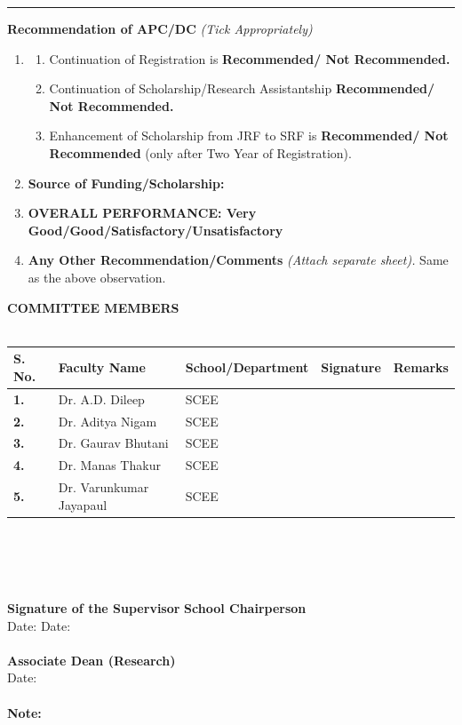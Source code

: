 \documentclass[12 pt, a4paper]{article}
\newcommand{\HRule}{\rule{\linewidth}{1mm}}
\begin{document}
\vskip 0.7cm
{\raggedleft{}\HRule}
\textbf{Recommendation of APC/DC} \textit{(Tick Appropriately)}
\begin{enumerate}
	\item
	\begin{enumerate}
\item Continuation of Registration is \textbf{Recommended/ Not Recommended.}
\item Continuation of Scholarship/Research Assistantship \textbf{ Recommended/ Not Recommended.}
\item Enhancement of Scholarship from JRF to SRF is \textbf{Recommended/ Not Recommended } (only
after Two Year of Registration).
\end{enumerate}
\item
\textbf{Source of Funding/Scholarship:}

\item \textbf{OVERALL PERFORMANCE: Very Good/Good/Satisfactory/Unsatisfactory}
\item \textbf{Any Other Recommendation/Comments} \textit{(Attach separate sheet).}
Same as the above observation.
\end{enumerate}
\vspace*{1cm}

\noindent \textbf{COMMITTEE MEMBERS}\\\\
\indent
\begin{tabular}{|p{1.25cm}|p{5cm}|p{4cm}|p{3cm}|p{2cm}|}
	\hline\rule{0pt}{15pt} \bf S. No. & \bf Faculty Name & \bf School/Department & \bf Signature & \bf Remarks \\ 
	\hline\rule{0pt}{18pt}\bf 1. & Dr. A.D. Dileep  & SCEE &  &  \\[10pt]
	\hline\rule{0pt}{18pt}\bf 2. & Dr. Aditya Nigam & SCEE &  &  \\ [10pt]
	\hline \rule{0pt}{18pt}\bf3. & Dr. Gaurav Bhutani & SCEE &  &  \\ [10pt] 
	\hline \rule{0pt}{18pt}\bf4. & Dr. Manas Thakur & SCEE &  &  \\ [10pt] 
	\hline \rule{0pt}{18pt}\bf5. & Dr. Varunkumar Jayapaul & SCEE &  &  \\ [10pt]
	\hline 
\end{tabular} \\\\\\\\
\textbf{Signature of the Supervisor} \hspace{7.0cm} \textbf{School Chairperson}\\
Date: \hspace{11.3cm}  Date:\\
\vspace{1cm} \\
\hspace*{6cm}\textbf{Associate Dean (Research)}\\
\hspace*{6cm}Date:\\\\
\textbf{Note:}
\end{document}
